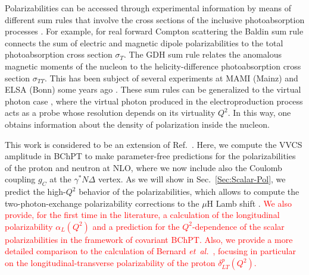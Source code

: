 \documentclass[twocolumn,prc,showpacs,nofootinbib,preprintnumbers,amsmath,amssymb,superscriptaddress]{revtex4-1}
\begin{document}
Polarizabilities can be accessed through experimental information by means of different sum rules that involve the cross sections of the inclusive photoabsorption processes \cite{Drechsel:2002ar,Hagelstein:2015egb}. 
For example, for real forward Compton scattering the Baldin sum rule \cite{BaldinSumRule} connects the sum of electric and magnetic dipole polarizabilities to the total photoabsorption cross section $\sigma_T$. The GDH sum rule \cite{Gerasimov:1965et,Drell:1966jv} relates the anomalous magnetic moments of the nucleon to the helicity-difference photoabsorption cross section $\sigma_{TT}$. This has been subject of several experiments at MAMI (Mainz) and ELSA (Bonn) some years ago \cite{Ahrens:2001qt, Helbing:2002eg}.
These sum rules can be generalized to the virtual photon case \cite{Drechsel:2002ar}, where the virtual photon produced in the electroproduction process acts as a probe whose resolution depends on its virtuality $Q^2$. In this way, one obtains information about the density of polarization inside the nucleon.

%
%

This work is considered to be an extension of Ref.~\cite{Lensky:2014dda}.
Here, we compute the VVCS amplitude in BChPT to make parameter-free predictions for the polarizabilities of the proton and neutron at NLO, where we now include also the Coulomb coupling $g_C$ at the $\gamma^*N \Delta$ vertex.
As we will show in Sec.~\ref{Sec:Scalar-Pol}, we predict the high-$Q^2$ behavior of the polarizabilities, which allows to compute the two-photon-exchange polarizability corrections to the $\mu$H Lamb shift \cite{Alarcon:2013cba}. \textcolor{red}{We also provide, for the first time in the literature, a calculation of the longitudinal polarizability $\alpha_L(Q^2)$ and a prediction for the $Q^2$-dependence of the scalar polarizabilities in the framework of covariant BChPT. Also, we provide a more detailed comparison to the calculation of Bernard {\it et~al.}~\cite{Bernard:2012hb}, focusing in particular on the longitudinal-transverse polarizability of the proton $\delta_{LT}^{p}(Q^2)$.}
\end{document}
